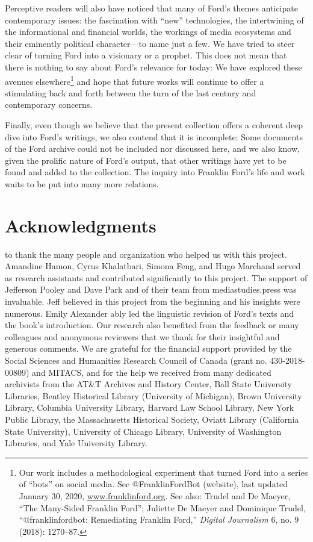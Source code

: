 \documentclass[twoside,symmetric,nobib,justified]{tufte-book}
\let\oldchapter\chapter
\def\chapter{%
  \setcounter{footnote}{0}%
  \oldchapter
}
\begin{document}
Perceptive readers will also have noticed that many of Ford's themes
anticipate contemporary issues: the fascination with ``new''
technologies, the intertwining of the informational and financial
worlds, the workings of media ecosystems and their eminently political
character---to name just a few. We have tried to steer clear of turning
Ford into a visionary or a prophet. This does not mean that there is
nothing to say about Ford's relevance for today: We have explored these
avenues elsewhere\footnote{Our work includes a methodological experiment
  that turned Ford into a series of ``bots'' on social media. See
  @FranklinFordBot (website), last updated January 30, 2020,
  \href{http://www.franklinford.org}{www.franklinford.org}. See
  also: Trudel and De Maeyer, ``The Many-Sided Franklin Ford''; Juliette
  De Maeyer and Dominique Trudel, ``@franklinfordbot: Remediating
  Franklin Ford,'' \emph{Digital Journalism} 6, no. 9 (2018): 1270--87.}
and hope that future works will continue to offer a stimulating back and
forth between the turn of the last century and contemporary concerns.

Finally, even though we believe that the present collection offers a
coherent deep dive into Ford's writings, we also contend that it is
incomplete: Some documents of the Ford archive could not be included nor
discussed here, and we also know, given the prolific nature of Ford's
output, that other writings have yet to be found and added to the
collection. The inquiry into Franklin Ford's life and work waits to be
put into many more relations.

\chapter[Acknowledgments]{Acknowledgments}
\label{ch:Acknowledgments}

 to thank the many people and organization who helped us
with this project. Amandine Hamon, Cyrus Khalatbari, Simona Feng, and
Hugo Marchand served as research assistants and contributed
significantly to this project. The support of Jefferson Pooley and Dave
Park and of their team from mediastudies.press was invaluable. Jeff
believed in this project from the beginning and his insights were
numerous. Emily Alexander ably led the linguistic revision of Ford's
texts and the book's introduction. Our research also benefited from the
feedback or many colleagues and anonymous reviewers that we thank for
their insightful and generous comments. We are grateful for the
financial support provided by the Social Sciences and Humanities
Research Council of Canada (grant no. 430-2018-00809) and MITACS, and
for the help we received from many dedicated archivists from the
AT\&T Archives and History Center, Ball State University Libraries,
Bentley Historical Library (University of Michigan), Brown University
Library, Columbia University Library, Harvard Law School Library, New
York Public Library, the Massachusetts Historical Society, Oviatt
Library (California State University), University of Chicago Library,
University of Washington Libraries, and Yale University Library.
\end{document}
